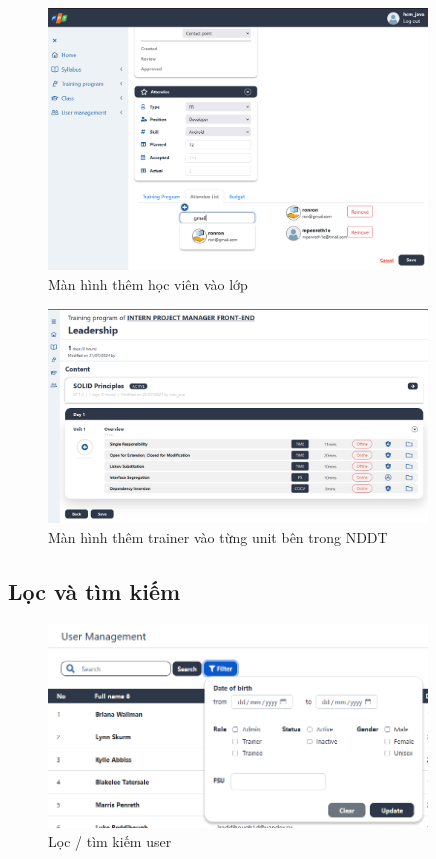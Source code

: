 \documentclass[report.tex]{subfiles}
\begin{document}
\begin{figure}[!htb]
{\centering
\includegraphics[width=380px]{../meta/ui.class-attendee.png}
\caption{Màn hình thêm học viên vào lớp}
\par
}
\end{figure}
\FloatBarrier

\begin{figure}[!htb]
{\centering
\includegraphics[width=380px]{../meta/ui.class-add-trainer.png}
\caption[Màn hình thêm trainer]{Màn hình thêm trainer vào từng unit bên trong NDDT}
\par
}
\end{figure}
\FloatBarrier

\subsection{Lọc và tìm kiếm}

\begin{figure}[!htb]
{\centering
\includegraphics[width=380px]{../meta/ui.user-filter.png}
\caption{Lọc / tìm kiếm user}
\par
}
\end{figure}
\FloatBarrier
\end{document}
